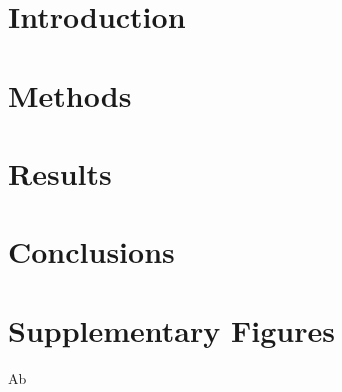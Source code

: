 \documentclass[11pt]{article}
\begin{document}







\section*{Introduction}






\section*{Methods}





\section*{Results}



\section*{Conclusions}






\clearpage

\appendix
\renewcommand{\thefigure}{S\arabic{figure}}
\setcounter{figure}{0}


\section*{Supplementary Figures}

Ab 




\end{document}
